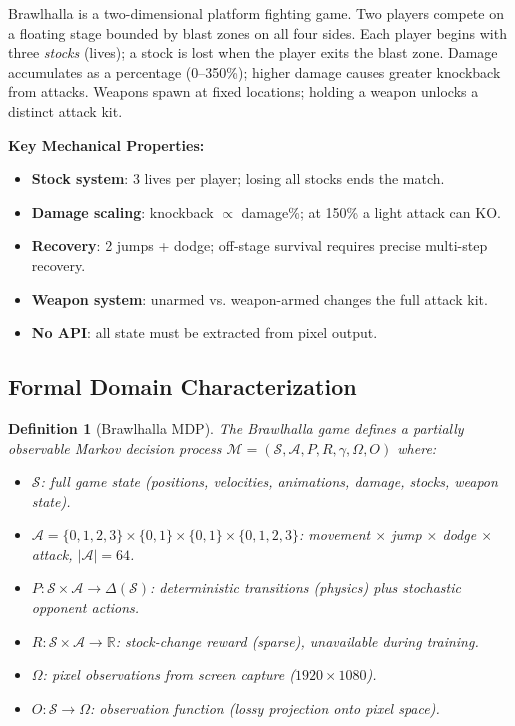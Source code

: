 \documentclass[11pt,a4paper]{article}
\newtheorem{definition}{Definition}
\begin{document}
Brawlhalla is a two-dimensional platform fighting game.
Two players compete on a floating stage bounded by blast zones on all four sides.
Each player begins with three \emph{stocks} (lives); a stock is lost when the player exits the blast zone.
Damage accumulates as a percentage (0--350\%); higher damage causes greater knockback from attacks.
Weapons spawn at fixed locations; holding a weapon unlocks a distinct attack kit.
\newpage
\begin{mdframed}[backgroundcolor=lightblue!50,linecolor=darkblue,linewidth=1pt]
\textbf{Key Mechanical Properties:} \\ 
\vspace{-0.5em}
\begin{itemize}[leftmargin=1.5em,topsep=0pt,itemsep=2pt]
    \item \textbf{Stock system}: 3 lives per player; losing all stocks ends the match.
    \item \textbf{Damage scaling}: knockback $\propto$ damage\%; at 150\% a light attack can KO.
    \item \textbf{Recovery}: 2 jumps + dodge; off-stage survival requires precise multi-step recovery.
    \item \textbf{Weapon system}: unarmed vs. weapon-armed changes the full attack kit.
    \item \textbf{No API}: all state must be extracted from pixel output.
\end{itemize}
\end{mdframed}

\subsection{Formal Domain Characterization}

\begin{definition}[Brawlhalla MDP]
The Brawlhalla game defines a partially observable Markov decision process $\mathcal{M} = (\mathcal{S}, \mathcal{A}, P, R, \gamma, \Omega, O)$ where:
\begin{itemize}[leftmargin=1.5em,itemsep=1pt]
    \item $\mathcal{S}$: full game state (positions, velocities, animations, damage, stocks, weapon state).
    \item $\mathcal{A} = \{0,1,2,3\} \times \{0,1\} \times \{0,1\} \times \{0,1,2,3\}$: movement $\times$ jump $\times$ dodge $\times$ attack, $|\mathcal{A}| = 64$.
    \item $P: \mathcal{S} \times \mathcal{A} \to \Delta(\mathcal{S})$: deterministic transitions (physics) plus stochastic opponent actions.
    \item $R: \mathcal{S} \times \mathcal{A} \to \mathbb{R}$: stock-change reward (sparse), unavailable during training.
    \item $\Omega$: pixel observations from screen capture ($1920 \times 1080$).
    \item $O: \mathcal{S} \to \Omega$: observation function (lossy projection onto pixel space).
\end{itemize}
\end{definition}
\end{document}
